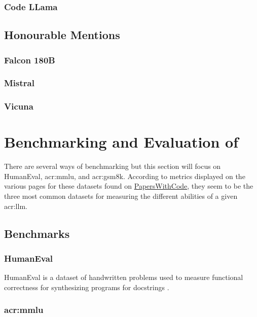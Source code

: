 \subsubsection{Code LLama}

\subsection{Honourable Mentions}

\subsubsection{Falcon 180B}
\subsubsection{Mistral}
\subsubsection{Vicuna}

\section[Benchmarking and Evaluation of LLMs]{Benchmarking and Evaluation of }\label{subsec:llm-benchmarking-and-evaluation}

There are several ways of benchmarking  but this section will focus on HumanEval, \gls{acr:mmlu}, and \gls{acr:gsm8k}. According to metrics displayed on the various pages for these datasets found on \href{https://paperswithcode.com}{PapersWithCode}, they seem to be the three most common datasets for measuring the different abilities of a given \acrshort{acr:llm}.

\subsection{Benchmarks}\label{subsec:benchmarks}

\subsubsection{HumanEval}\label{subsubsec:humaneval}

HumanEval is a dataset of handwritten problems used to measure functional correctness for synthesizing programs for docstrings \citep[2-4]{chenEvaluatingLargeLanguage2021}.

\subsubsection[Multitask Language Understanding]{\acrlong{acr:mmlu}}

